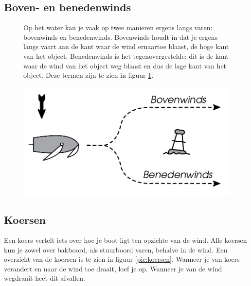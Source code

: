 \subsection{Boven- en benedenwinds}
\begin{figure}[H]
	\centering
	\begin{minipage}[t]{0.55\textwidth}
		\vspace{-4cm}
		Op het water kan je vaak op twee manieren ergens langs varen: bovenwinds en benedenwinds. Bovenwinds houdt in dat je ergens langs vaart aan de kant waar de wind ernaartoe blaast, de hoge kant van het object. Benedenwinds is het tegenovergestelde: dit is de kant waar de wind van het object weg blaast en dus de lage kant van het object. Deze termen zijn te zien in figuur \ref{pic:boven_benedenwinds}.
	\end{minipage}
	\hfill
	\begin{minipage}[b]{0.40\textwidth}
		\centering
		\includegraphics[width=\textwidth]{Hoofdstukken/Onderdelen/pdf/boven_en_benedenwinds.pdf}
		\caption{}
		\centering
		\label{pic:boven_benedenwinds}
	\end{minipage}
\end{figure}

\vfil\newpage

\subsection{Koersen}
Een koers vertelt iets over hoe je boot ligt ten opzichte van de wind. Alle koersen kun je zowel over bakboord, als stuurboord varen, behalve in de wind. Een overzicht van de koersen is te zien in figuur \ref{pic:koersen}. Wanneer je van koers verandert en naar de wind toe draait, loef je op. Wanneer je van de wind wegdraait heet dit afvallen. 

